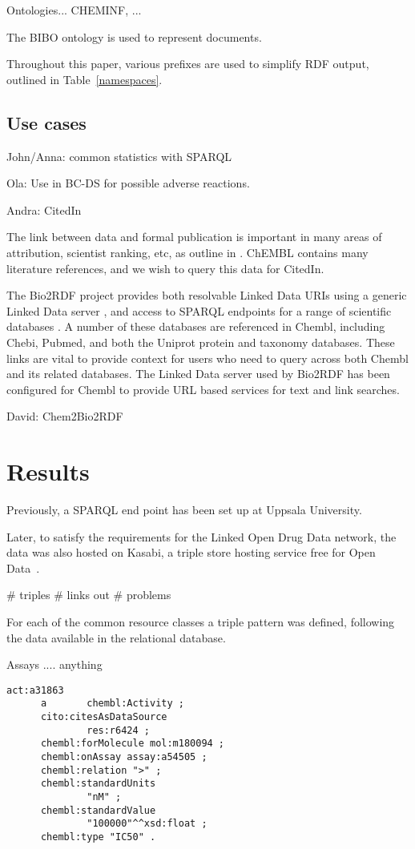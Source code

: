 \documentclass[sw]{iosart2c}
\begin{document}
Ontologies... CHEMINF, ...

The BIBO ontology is used to represent documents.

Throughout this paper, various prefixes are used to simplify RDF output, outlined
in Table~\ref{namespaces}.

\subsection{Use cases}

John/Anna: common statistics with SPARQL

Ola: Use in BC-DS for possible adverse reactions.

Andra: CitedIn

The link between data and formal publication is important in many areas of
attribution, scientist ranking, etc, as outline in \cite{Waagmeester2012}.
ChEMBL contains many literature references, and we wish to query this data
for CitedIn.

The Bio2RDF project provides both resolvable Linked Data URIs using a generic Linked Data server \cite{Ansell2011}, and access to SPARQL endpoints for a range of scientific databases \cite{Belleau2008}. A number of these databases are referenced in Chembl, including Chebi, Pubmed, and both the Uniprot protein and taxonomy databases. These links are vital to provide context for users who need to query across both Chembl and its related databases. The Linked Data server used by Bio2RDF has been configured for Chembl to provide URL based services for text and link searches.

David: Chem2Bio2RDF

\section{Results}\label{s3}

Previously, a SPARQL end point has been set up at Uppsala University.

Later, to satisfy the requirements for the Linked Open Drug Data \cite{Samwald2011}
network, the data was also hosted on Kasabi, a triple store hosting service
free for Open Data~\cite{}.

\# triples
\# links out
\# problems

For each of the common resource classes a triple pattern was defined, following the
data available in the relational database.

Assays .... anything

\begin{small}
\begin{verbatim}
act:a31863
      a       chembl:Activity ;
      cito:citesAsDataSource
              res:r6424 ;
      chembl:forMolecule mol:m180094 ;
      chembl:onAssay assay:a54505 ;
      chembl:relation ">" ;
      chembl:standardUnits
              "nM" ;
      chembl:standardValue
              "100000"^^xsd:float ;
      chembl:type "IC50" .
\end{verbatim}
\end{small}
\end{document}
